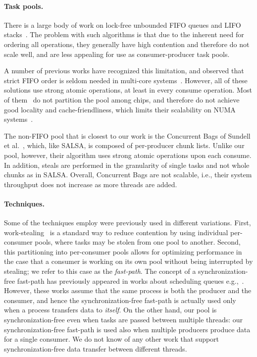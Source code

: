\paragraph{Task pools.}
There is a large body of work on lock-free unbounded FIFO queues and LIFO
stacks~\cite{Gidenstam:2010:CLQ:1940234.1940266,Hendler:2004:SLS:1007912.1007944,
Hoffman:2007:BQ:1782394.1782423, Michael:1996:SFP:248052.248106,Moir:2005:UEI:1073970.1074013}.
The problem with such algorithms is that due to the inherent need for ordering all operations, they
generally have high contention and therefore do not scale well, and are less appealing for use as 
consumer-producer task pools. 

A number of previous works have recognized this limitation, and observed that strict FIFO
order is seldom needed in multi-core systems~\cite{Afek:2010:SPP:1885276.1885295,springerlink:10.1007/978-3-642-17653-1_29,
Basin:2011:CST:2075029.2075087,Sundell:2011:LAC:1989493.1989550}. However, all of these solutions
use strong atomic operations, at least in every consume operation. Most of
them~\cite{Afek:2010:SPP:1885276.1885295,springerlink:10.1007/978-3-642-17653-1_29,
Basin:2011:CST:2075029.2075087} do not partition the pool among chips, and therefore do not achieve
good locality and cache-friendliness, which limits their scalability on NUMA systems~\cite{Basin:Thesis:2011}.

The non-FIFO pool that is closest to our work is the Concurrent Bags of
Sundell et al.~\cite{Sundell:2011:LAC:1989493.1989550}, which, like SALSA, is composed of
per-producer chunk lists. Unlike our pool, however, their algorithm uses strong atomic operations
upon each consume. In addition, steals are performed in the granularity of single tasks and
not whole chunks as in SALSA. Overall, Concurrent Bags are not scalable, i.e., their system
throughput does not increase as more threads are added.

\paragraph{Techniques.}
Some of the techniques employ were previously used in different
variations. First, work-stealing~\cite{Blumofe:1999:SMC:324133.324234} is a standard way to reduce
contention by using individual per-consumer pools, where tasks may be stolen from one pool to
another. Second, this partitioning into per-consumer pools allows for optimizing performance in the
case that a consumer is working on its own pool without being interrupted by stealing; we refer to
this case as the \emph{fast-path}. The concept of a synchronization-free fast-path has previously
appeared in works about scheduling queues
e.g.,~\cite{Arora:1998:TSM:277651.277678,Hendler:2006:DNW:1160290.1160294}. However, these works
assume that the same process is both the producer and the consumer, and hence the
synchronization-free fast-path is actually used only when a process transfers data to \emph{itself}.
On the other hand, our pool is synchronization-free even when tasks are passed between multiple
threads: our synchronization-free fast-path is used also when multiple producers produce data for
a single consumer. We do not know of any other work that support synchronization-free data
transfer between different threads.

